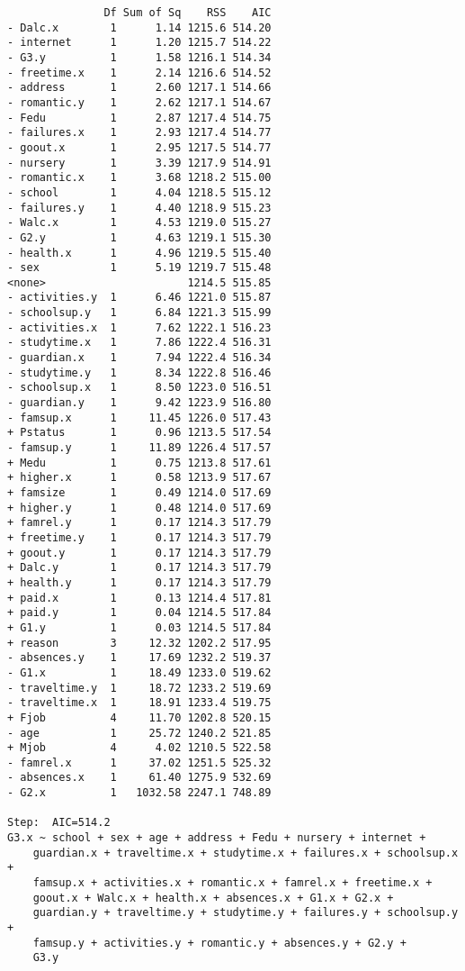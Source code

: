 \documentclass[11pt]{article}
\begin{document}
\begin{enumerate}
\begin{verbatim}
               Df Sum of Sq    RSS    AIC
- Dalc.x        1      1.14 1215.6 514.20
- internet      1      1.20 1215.7 514.22
- G3.y          1      1.58 1216.1 514.34
- freetime.x    1      2.14 1216.6 514.52
- address       1      2.60 1217.1 514.66
- romantic.y    1      2.62 1217.1 514.67
- Fedu          1      2.87 1217.4 514.75
- failures.x    1      2.93 1217.4 514.77
- goout.x       1      2.95 1217.5 514.77
- nursery       1      3.39 1217.9 514.91
- romantic.x    1      3.68 1218.2 515.00
- school        1      4.04 1218.5 515.12
- failures.y    1      4.40 1218.9 515.23
- Walc.x        1      4.53 1219.0 515.27
- G2.y          1      4.63 1219.1 515.30
- health.x      1      4.96 1219.5 515.40
- sex           1      5.19 1219.7 515.48
<none>                      1214.5 515.85
- activities.y  1      6.46 1221.0 515.87
- schoolsup.y   1      6.84 1221.3 515.99
- activities.x  1      7.62 1222.1 516.23
- studytime.x   1      7.86 1222.4 516.31
- guardian.x    1      7.94 1222.4 516.34
- studytime.y   1      8.34 1222.8 516.46
- schoolsup.x   1      8.50 1223.0 516.51
- guardian.y    1      9.42 1223.9 516.80
- famsup.x      1     11.45 1226.0 517.43
+ Pstatus       1      0.96 1213.5 517.54
- famsup.y      1     11.89 1226.4 517.57
+ Medu          1      0.75 1213.8 517.61
+ higher.x      1      0.58 1213.9 517.67
+ famsize       1      0.49 1214.0 517.69
+ higher.y      1      0.48 1214.0 517.69
+ famrel.y      1      0.17 1214.3 517.79
+ freetime.y    1      0.17 1214.3 517.79
+ goout.y       1      0.17 1214.3 517.79
+ Dalc.y        1      0.17 1214.3 517.79
+ health.y      1      0.17 1214.3 517.79
+ paid.x        1      0.13 1214.4 517.81
+ paid.y        1      0.04 1214.5 517.84
+ G1.y          1      0.03 1214.5 517.84
+ reason        3     12.32 1202.2 517.95
- absences.y    1     17.69 1232.2 519.37
- G1.x          1     18.49 1233.0 519.62
- traveltime.y  1     18.72 1233.2 519.69
- traveltime.x  1     18.91 1233.4 519.75
+ Fjob          4     11.70 1202.8 520.15
- age           1     25.72 1240.2 521.85
+ Mjob          4      4.02 1210.5 522.58
- famrel.x      1     37.02 1251.5 525.32
- absences.x    1     61.40 1275.9 532.69
- G2.x          1   1032.58 2247.1 748.89

Step:  AIC=514.2
G3.x ~ school + sex + age + address + Fedu + nursery + internet + 
    guardian.x + traveltime.x + studytime.x + failures.x + schoolsup.x + 
    famsup.x + activities.x + romantic.x + famrel.x + freetime.x + 
    goout.x + Walc.x + health.x + absences.x + G1.x + G2.x + 
    guardian.y + traveltime.y + studytime.y + failures.y + schoolsup.y + 
    famsup.y + activities.y + romantic.y + absences.y + G2.y + 
    G3.y


\end{verbatim}
\end{enumerate}
\end{document}
